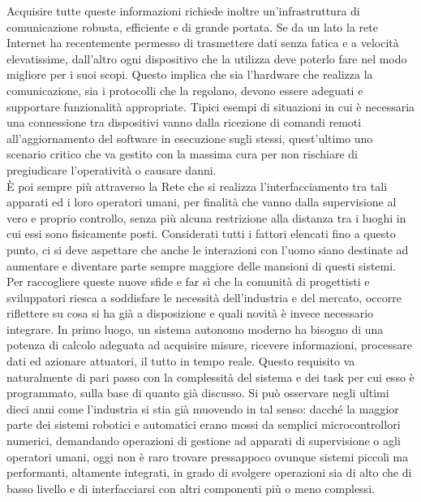 Acquisire tutte queste informazioni richiede inoltre un'infrastruttura di comunicazione robusta, efficiente e di grande portata. Se da un lato la rete Internet ha recentemente permesso di trasmettere dati senza fatica e a velocità elevatissime, dall'altro ogni dispositivo che la utilizza deve poterlo fare nel modo migliore per i suoi scopi. Questo implica che sia l'hardware che realizza la comunicazione, sia i protocolli che la regolano, devono essere adeguati e supportare funzionalità appropriate. Tipici esempi di situazioni in cui è necessaria una connessione tra dispositivi vanno dalla ricezione di comandi remoti all'aggiornamento del software in esecuzione sugli stessi, quest'ultimo uno scenario critico che va gestito con la massima cura per non rischiare di pregiudicare l'operatività o causare danni.\\
È poi sempre più attraverso la Rete che si realizza l'interfacciamento tra tali apparati ed i loro operatori umani, per finalità che vanno dalla supervisione al vero e proprio controllo, senza più alcuna restrizione alla distanza tra i luoghi in cui essi sono fisicamente posti. Considerati tutti i fattori elencati fino a questo punto, ci si deve aspettare che anche le interazioni con l'uomo siano destinate ad aumentare e diventare parte sempre maggiore delle mansioni di questi sistemi.\\
Per raccogliere queste nuove sfide e far sì che la comunità di progettisti e sviluppatori riesca a soddisfare le necessità dell'industria e del mercato, occorre riflettere su cosa si ha già a disposizione e quali novità è invece necessario integrare. In primo luogo, un sistema autonomo moderno ha bisogno di una potenza di calcolo adeguata ad acquisire misure, ricevere informazioni, processare dati ed azionare attuatori, il tutto in tempo reale. Questo requisito va naturalmente di pari passo con la complessità del sistema e dei task per cui esso è programmato, sulla base di quanto già discusso. Si può osservare negli ultimi dieci anni come l'industria si stia già muovendo in tal senso: dacché la maggior parte dei sistemi robotici e automatici erano mossi da semplici microcontrollori numerici, demandando operazioni di gestione ad apparati di supervisione o agli operatori umani, oggi non è raro trovare pressappoco ovunque sistemi piccoli ma performanti, altamente integrati, in grado di svolgere operazioni sia di alto che di basso livello e di interfacciarsi con altri componenti più o meno complessi.\newpage
